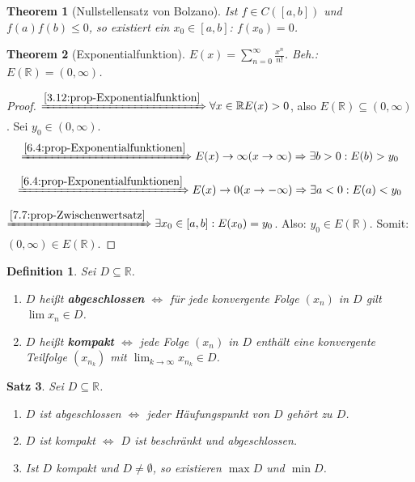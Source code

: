 \documentclass[14pt,titlepage,ngerman,a4paper,headsepline,DIV15,halfparskip*]{scrartcl}
\newcommand{\R}{\mathbb{R}}
\theoremstyle{named}
\newtheorem{namedtheorem}{Theorem} \counterwithin{namedtheorem}{section}
\theoremstyle{dotless}
\newtheorem{satz}[namedtheorem]{Satz}
\newtheorem*{definition}{Definition}
\begin{document}
\begin{namedtheorem}[Nullstellensatz von Bolzano] \label{7.8:prop-NullstellensatzVonBolzano}
	Ist $f \in C\left([a, b]\right)$ und $f(a)f(b) \leq 0$, so existiert ein $x_{0} \in [a, b]$: $f(x_{0}) = 0$.
\end{namedtheorem}


\begin{namedtheorem}[Exponentialfunktion]
	$E(x) = \sum_{n=0}^{\infty} \frac{x^{n}}{n!}$. Beh.: $E(\R) = (0, \infty)$.	
\end{namedtheorem}

\begin{proof}
	$\xRightarrow[]{\ref{3.12:prop-Exponentialfunktion}} \forall x \in \R E(x) > 0$, also $E(\R) \subseteq (0, \infty)$. Sei $y_{0} \in (0, \infty)$.
	$$ \xRightarrow[]{\ref{6.4:prop-Exponentialfunktionen}} E(x) \rightarrow \infty (x \rightarrow \infty) \Rightarrow \exists b > 0: E(b) > y_{0} $$	
	$$ \xRightarrow[]{\ref{6.4:prop-Exponentialfunktionen}} E(x) \rightarrow 0 (x \rightarrow -\infty) \Rightarrow \exists a < 0: E(a) < y_{0} $$
	$\xRightarrow[]{\ref{7.7:prop-Zwischenwertsatz}} \exists x_{0} \in [a, b]: E(x_{0}) = y_{0}$. Also: $y_{0} \in E(\R)$. Somit: $(0, \infty) \in E(\R)$.
\end{proof}

 
\begin{definition}
	Sei $D \subseteq \R$.
	\begin{enumerate}
		\item $D$ hei{\ss}t \textbf{abgeschlossen} $\iff$ für jede konvergente Folge $(x_{n})$ in $D$ gilt $\lim x_{n} \in D$.
		\item $D$ hei{\ss}t \textbf{kompakt} $\iff$ jede Folge $(x_{n})$ in $D$ enthält eine konvergente Teilfolge $(x_{n_{k}})$ mit $\lim_{k \rightarrow \infty} x_{n_{k}} \in D$.
	\end{enumerate}
\end{definition}


\begin{satz} \label{7.10:satz}
	Sei $D \subseteq \R$.
	\begin{enumerate}
		\item $D$ ist abgeschlossen $\iff$ jeder Häufungspunkt von $D$ gehört zu $D$.
		\item $D$ ist kompakt $\iff$ $D$ ist beschränkt und abgeschlossen.
		\item Ist $D$ kompakt und $D \neq \emptyset$, so existieren $\max D$ und $\min D$.
	\end{enumerate}
\end{satz}
\end{document}
